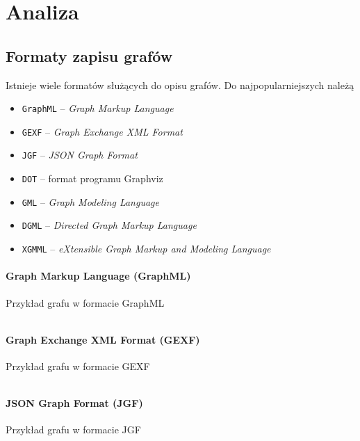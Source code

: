 \chapter{Analiza}
\section{Formaty zapisu grafów} \label{sec:graph-formats}
Istnieje wiele formatów służących do opisu grafów. Do najpopularniejszych należą \cite{bernard,gephi}

\begin{itemize}
\setlength\itemsep{0em}
\item \texttt{GraphML} -- \textit{Graph Markup Language}
\item \texttt{GEXF} -- \textit{Graph Exchange XML Format}
\item \texttt{JGF} -- \textit{JSON Graph Format}
\item \texttt{DOT} -- format programu Graphviz
\item \texttt{GML} -- \textit{Graph Modeling Language }
\item \texttt{DGML} -- \textit{Directed Graph Markup Language}
\item \texttt{XGMML} -- \textit{eXtensible Graph Markup and Modeling Language}
\end{itemize}

\subsubsection{Graph Markup Language (GraphML)}
\begin{listing}[H]
    \caption{Przykład grafu w formacie GraphML}
    \inputminted{xml}{example.graphml}
    \label{lst:graphml-example}
\end{listing}

\subsubsection{Graph Exchange XML Format (GEXF)}
\begin{listing}[H]
    \caption{Przykład grafu w formacie GEXF}
    \inputminted{xml}{example.gexf}
    \label{lst:gexf-example}
\end{listing}

\subsubsection{JSON Graph Format (JGF)} 
\begin{listing}[H]
    \caption{Przykład grafu w formacie JGF}
    \inputminted{json}{example.json}
    \label{lst:jgf-example}
\end{listing}

